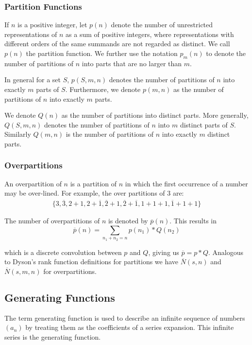 \subsubsection{Partition Functions}
If $n$ is a positive integer, let $p(n)$ denote the number of unrestricted representations of $n$ as a sum of positive integers, where representations with different orders of the same summands are not regarded as distinct. We call $p(n)$ the partition function. We further use the notation $p_m(n)$ to denote the number of partitions of $n$ into parts that are no larger than $m$.

In general for a set $S$, $p(S, m, n)$ denotes the number of partitions of $n$ into exactly $m$ parts of $S$. Furthermore, we denote $p(m,n)$ as the number of partitions of $n$ into exactly $m$ parts.

We denote $Q(n)$ as the number of partitions into distinct parts. More generally, $Q( S, m, n)$ denotes the number of partitions of $n$ into $m$ distinct parts of $S$. Similarly $Q( m, n )$ is the number of partitions of $n$ into exactly $m$ distinct parts.

\subsubsection{Overpartitions}
An overpartition of $n$ is a partition of $n$ in which the first occurrence of a number may be over-lined. For example, the over partitions of 3 are:
\begin{align*}
      \{ 3, \overline 3
    , 2 + 1 , 2 + \overline 1 , \overline 2 + 1 , \overline 2 + \overline 1  
    , 1 + 1 + 1 , \overline 1 + 1 + 1 \}
\end{align*}

The number of overpartitions of $n$ is denoted by $\overline p(n)$. This results in
    $$\overline p(n) = \sum_{n_1 + n _2 = n} p(n_1)*Q(n_2)$$

which is a discrete convolution between $p$ and $Q$, giving us $\overline p = p*Q$. Analogous to Dyson's rank function definitions for partitions we have $\overline N(s, n)$ and $\overline N(s, m, n)$ for overpartitions.

\subsection{Generating Functions}
The term generating function is used to describe an infinite sequence of numbers $(a_n)$ by treating them as the coefficients of a series expansion. This infinite series is the generating function.

